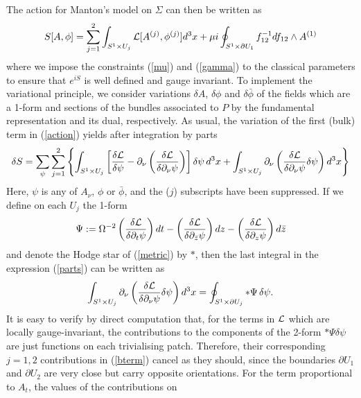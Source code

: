 \documentclass[a4paper,11pt]{article}
\begin{document}
The action for Manton's model on $\Sigma$ can then be written as
\begin{equation} \label{action}
S[A,\phi]=\sum_{j=1}^{2} \int_{S^{1}\times U_{j}} 
{\cal L}[A^{(j)}, \phi^{(j)}] d^{3}x
+\mu i\oint_{S^{1}\times \partial U_{1}}f_{12}^{-1}df_{12}\wedge A^{(1)}
\end{equation}
where we impose the constraints (\ref{mu}) and (\ref{gamma}) to the
classical parameters to ensure that $e^{iS}$ is well defined and 
gauge invariant. 
To implement the variational principle, we consider variations $\delta
A$, $\delta \phi$ and $\delta \bar{\phi}$ of the fields which are 
a 1-form and sections of the bundles 
associated to ${P}$ by the fundamental representation and its dual,
respectively. 
As usual, the variation of the first (bulk) term in (\ref{action}) 
yields after integration by parts
\begin{equation}\label{parts}
\delta S = \sum_{\psi}\sum_{j=1}^{2}\left\{
\int_{S^{1}\times U_{j}} \left[
\frac{\delta{\cal L}}{\delta \psi}-\partial_{\nu}
\left(\frac{\delta {\cal L}}{\delta\partial_{\nu}\psi}\right)
\right]\delta \psi \,d^{3}x
+
\int_{S^{1}\times U_{j}}
\partial_{\nu}\left(\frac{\delta{\cal L}}
{\delta \partial_{\nu}\psi}\delta \psi \right)d^{3}x
\right\}
\end{equation}
Here, $\psi$ is any of $A_{\nu}$, $\phi$ or $\bar{\phi}$, and the
($j$) subscripts have been suppressed. If we define on each $U_{j}$ the 
1-form
\[
\Psi:=\Omega^{-2}\left( \frac{\delta {\cal L}}{\delta 
\partial_{t} \psi}\right) dt-
\left( \frac{\delta {\cal L}}{\delta 
\partial_{\bar{z}} \psi}\right)dz-
\left( \frac{\delta {\cal L}}{\delta 
\partial_{z} \psi}\right) d\bar{z}
\]
and denote the Hodge star of (\ref{metric}) by $*$, then the last
integral in the expression (\ref{parts}) can be written as
\begin{equation}\label{bterm}
\int_{S^{1}\times U_{j}}\partial_{\nu}\left(\frac{\delta{\cal L}}
{\delta \partial_{\nu}\psi}\delta \psi \right)d^{3}x=
\oint_{S^{1}\times \partial U_{j}}
*\Psi\,\delta \psi.
\end{equation}
It is easy to verify by direct computation that, for the terms in
${\cal L}$ which are locally gauge-invariant, the contributions to the
components of the 2-form $*\Psi\delta\psi$ are just functions on each
trivialising patch. Therefore, their corresponding $j=1,2$
contributions in (\ref{bterm}) cancel as they should, since the boundaries 
$\partial U_{1}$ and
$\partial U_{2}$ are very close but carry opposite orientations. For 
the term proportional to $A_{t}$, the values of the contributions on 
\end{document}

